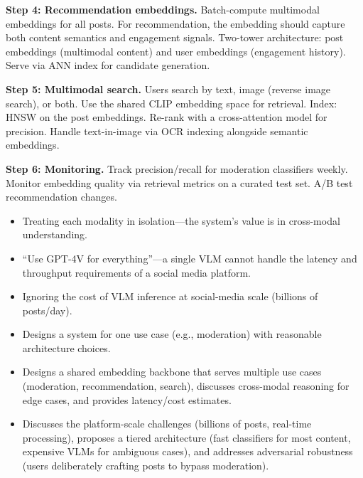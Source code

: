 \begin{interviewq}
\textbf{Step 4: Recommendation embeddings.} Batch-compute multimodal embeddings for all posts. For recommendation, the embedding should capture both content semantics and engagement signals. Two-tower architecture: post embeddings (multimodal content) and user embeddings (engagement history). Serve via ANN index for candidate generation.

\textbf{Step 5: Multimodal search.} Users search by text, image (reverse image search), or both. Use the shared CLIP embedding space for retrieval. Index: HNSW on the post embeddings. Re-rank with a cross-attention model for precision. Handle text-in-image via OCR indexing alongside semantic embeddings.

\textbf{Step 6: Monitoring.} Track precision/recall for moderation classifiers weekly. Monitor embedding quality via retrieval metrics on a curated test set. A/B test recommendation changes.

\redflags
\begin{itemize}
    \item Treating each modality in isolation---the system's value is in cross-modal understanding.
    \item ``Use GPT-4V for everything''---a single VLM cannot handle the latency and throughput requirements of a social media platform.
    \item Ignoring the cost of VLM inference at social-media scale (billions of posts/day).
\end{itemize}


\goodgreat
\begin{itemize}
    \item {} Designs a system for one use case (e.g., moderation) with reasonable architecture choices.
    \item {} Designs a shared embedding backbone that serves multiple use cases (moderation, recommendation, search), discusses cross-modal reasoning for edge cases, and provides latency/cost estimates.
    \item {} Discusses the platform-scale challenges (billions of posts, real-time processing), proposes a tiered architecture (fast classifiers for most content, expensive VLMs for ambiguous cases), and addresses adversarial robustness (users deliberately crafting posts to bypass moderation).
\end{itemize}

\end{interviewq}

